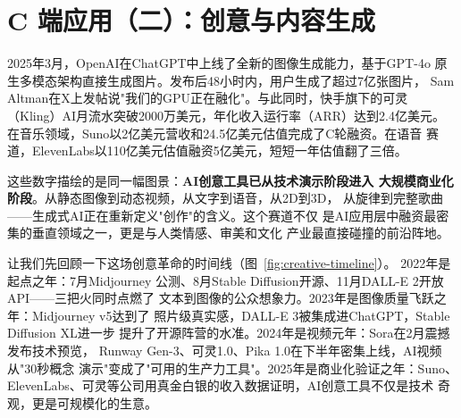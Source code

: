 
\chapter{C 端应用（二）：创意与内容生成}
\label{ch:consumer-create}


2025年3月，OpenAI在ChatGPT中上线了全新的图像生成能力，基于GPT-4o
原生多模态架构直接生成图片。发布后48小时内，用户生成了超过7亿张图片，
Sam Altman在X上发帖说"我们的GPU正在融化"。与此同时，快手旗下的可灵
（Kling）AI月流水突破2000万美元，年化收入运行率（ARR）达到2.4亿美元。
在音乐领域，Suno以2亿美元营收和24.5亿美元估值完成了C轮融资。在语音
赛道，ElevenLabs以110亿美元估值融资5亿美元，短短一年估值翻了三倍。

这些数字描绘的是同一幅图景：\textbf{AI创意工具已从技术演示阶段进入
大规模商业化阶段}。从静态图像到动态视频，从文字到语音，从2D到3D，
从旋律到完整歌曲——生成式AI正在重新定义"创作"的含义。这个赛道不仅
是AI应用层中融资最密集的垂直领域之一，更是与人类情感、审美和文化
产业最直接碰撞的前沿阵地。

让我们先回顾一下这场创意革命的时间线（图~\ref{fig:creative-timeline}）。
2022年是起点之年：7月Midjourney
公测、8月Stable Diffusion开源、11月DALL-E 2开放API——三把火同时点燃了
文本到图像的公众想象力。2023年是图像质量飞跃之年：Midjourney v5达到了
照片级真实感，DALL-E 3被集成进ChatGPT，Stable Diffusion XL进一步
提升了开源阵营的水准。2024年是视频元年：Sora在2月震撼发布技术预览，
Runway Gen-3、可灵1.0、Pika 1.0在下半年密集上线，AI视频从"30秒概念
演示"变成了"可用的生产力工具"。2025年是商业化验证之年：Suno、
ElevenLabs、可灵等公司用真金白银的收入数据证明，AI创意工具不仅是技术
奇观，更是可规模化的生意。

